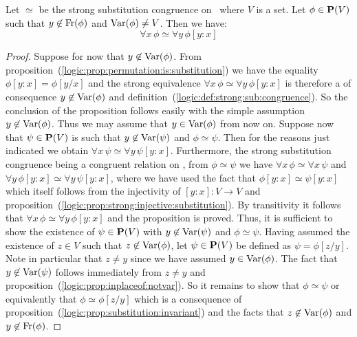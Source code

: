 \begin{prop}\label{logic:prop:link:strong:sub:congruence}
Let $\simeq$ be the strong substitution congruence on \pv\ where $V$
is a set. Let $\phi\in\mbox{${\bf P}(V)$}$ such that $y\not\in\mbox{\rm Fr}(\phi)$ and
$\mbox{\rm Var}(\phi)\neq V$. Then we have:
    \[
    \forall x\,\phi\simeq\forall y\,\phi[y\!:\!x]
    \]
\end{prop}
\begin{proof}
Suppose for now that $y\not\in\mbox{\rm Var}(\phi)$. From
proposition~(\ref{logic:prop:permutation:is:substitution}) we have
the equality $\phi[y\!:\!x]=\phi[y/x]$ and the strong equivalence
$\forall x\,\phi\simeq\forall y\,\phi[y\!:\!x]$ is therefore a of
consequence $y\not\in\mbox{\rm Var}(\phi)$ and
definition~(\ref{logic:def:strong:sub:congruence}). So the
conclusion of the proposition follows easily with the simple
assumption $y\not\in\mbox{\rm Var}(\phi)$. Thus we may assume that
$y\in\mbox{\rm Var}(\phi)$ from now on. Suppose now that $\psi\in\mbox{${\bf P}(V)$}$ is such
that $y\not\in\mbox{\rm Var}(\psi)$ and $\phi\simeq\psi$. Then for the reasons
just indicated we obtain $\forall x\,\psi\simeq\forall
y\,\psi[y\!:\!x]$. Furthermore, the strong substitution congruence
being a congruent relation on \pv, from $\phi\simeq\psi$ we have
$\forall x\,\phi\simeq\forall x\,\psi$ and $\forall
y\,\phi[y\!:\!x]\simeq\forall y\,\psi[y\!:\!x]$, where we have used
the fact that $\phi[y\!:\!x]\simeq\psi[y\!:\!x]$ which itself
follows from the injectivity of $[y\!:\!x]:V\to V$ and
proposition~(\ref{logic:prop:strong:injective:substitution}). By
transitivity it follows that $\forall x\,\phi\simeq\forall
y\,\phi[y\!:\!x]$ and the proposition is proved. Thus, it is
sufficient to show the existence of $\psi\in\mbox{${\bf P}(V)$}$ with
$y\not\in\mbox{\rm Var}(\psi)$ and $\phi\simeq\psi$. Having assumed the
existence of $z\in V$ such that $z\not\in\mbox{\rm Var}(\phi)$, let
$\psi\in\mbox{${\bf P}(V)$}$ be defined as $\psi=\phi[z/y]$. Note in particular that
$z\neq y$ since we have assumed $y\in\mbox{\rm Var}(\phi)$. The fact that
$y\not\in\mbox{\rm Var}(\psi)$ follows immediately from $z\neq y$ and
proposition~(\ref{logic:prop:inplaceof:notvar}). So it remains to
show that $\phi\simeq\psi$ or equivalently that
$\phi\simeq\phi[z/y]$ which is a consequence of
proposition~(\ref{logic:prop:substitution:invariant}) and the facts
that $z\not\in\mbox{\rm Var}(\phi)$ and $y\not\in\mbox{\rm Fr}(\phi)$.
\end{proof}

